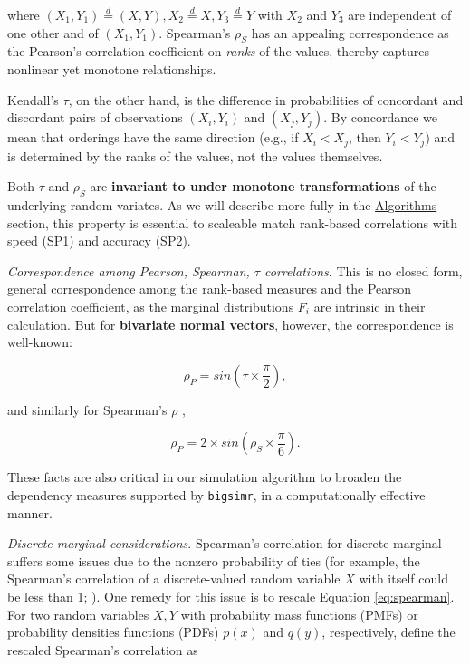 \documentclass[]{article}
\begin{document}
\noindent where \((X_1, Y_1) \overset{d}{=} (X,Y), X_2 \overset{d}{=} X, Y_3 \overset{d}{=} Y\) with \(X_2\) and \(Y_3\) are independent of one other and of \((X_1, Y_1)\).
Spearman's \(\rho_S\) has an appealing correspondence as the Pearson's correlation coefficient on \emph{ranks} of the values, thereby captures nonlinear yet monotone relationships.

Kendall's \(\tau\), on the other hand, is the difference in probabilities of concordant and discordant pairs of observations \((X_i, Y_i)\) and \((X_j, Y_j)\).
By concordance we mean that orderings have the same direction (e.g., if \(X_i < X_j\), then \(Y_i < Y_j\)) and is determined by the ranks of the values, not the values themselves.

Both \(\tau\) and \(\rho_S\) are \textbf{invariant to under monotone transformations} of the underlying random variates.
As we will describe more fully in the \protect\hyperlink{algorithms}{Algorithms} section, this property is essential to scaleable match rank-based correlations with speed (SP1) and accuracy (SP2).

\emph{Correspondence among Pearson, Spearman, \(\tau\) correlations}.
This is no closed form, general correspondence among the rank-based measures and the Pearson correlation coefficient, as the marginal distributions \(F_i\) are intrinsic in their calculation.
But for \textbf{bivariate normal vectors}, however, the correspondence is well-known:

\begin{equation}
\label{eq:convertKendall}
\rho_{P} = sin \left( \tau \times \frac{\pi}{2} \right), 
\end{equation}

\noindent and similarly for Spearman's \(\rho\) \citep{K58},

\begin{equation}
\label{eq:convertSpearman}
\rho_P = 2 \times sin \left( \rho_S \times \frac{\pi}{6} \right).
\end{equation}

These facts are also critical in our simulation algorithm to broaden the dependency measures supported by \texttt{bigsimr}, in a computationally effective manner.

\emph{Discrete marginal considerations}.
Spearman's correlation for discrete marginal suffers some issues due to the nonzero probability of ties (for example, the Spearman's correlation of a discrete-valued random variable \(X\) with itself could be less than 1; \citet{MB13}).
One remedy for this issue is to rescale Equation \eqref{eq:spearman}.
For two random variables \(X,Y\) with probability mass functions (PMFs) or probability densities functions (PDFs) \(p(x)\) and \(q(y)\), respectively, define the rescaled Spearman's correlation as
\end{document}
